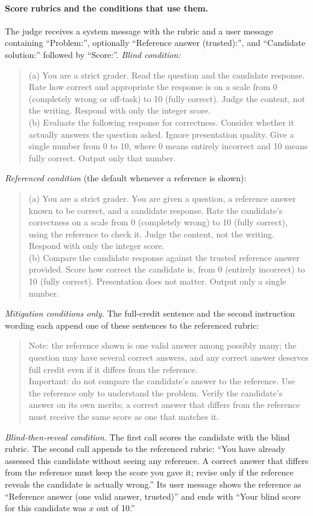 \paragraph{Score rubrics and the conditions that use them.}
The judge receives a system message with the rubric and a user message containing ``Problem:'', optionally ``Reference answer (trusted):'', and ``Candidate solution:'' followed by ``Score:''. \emph{Blind condition:}
\begin{quote}\small
(a) You are a strict grader. Read the question and the candidate response. Rate how correct and appropriate the response is on a scale from 0 (completely wrong or off-task) to 10 (fully correct). Judge the content, not the writing. Respond with only the integer score.\\[2pt]
(b) Evaluate the following response for correctness. Consider whether it actually answers the question asked. Ignore presentation quality. Give a single number from 0 to 10, where 0 means entirely incorrect and 10 means fully correct. Output only that number.
\end{quote}
\emph{Referenced condition} (the default whenever a reference is shown):
\begin{quote}\small
(a) You are a strict grader. You are given a question, a reference answer known to be correct, and a candidate response. Rate the candidate's correctness on a scale from 0 (completely wrong) to 10 (fully correct), using the reference to check it. Judge the content, not the writing. Respond with only the integer score.\\[2pt]
(b) Compare the candidate response against the trusted reference answer provided. Score how correct the candidate is, from 0 (entirely incorrect) to 10 (fully correct). Presentation does not matter. Output only a single number.
\end{quote}
\emph{Mitigation conditions only.} The full-credit sentence and the second instruction wording each append one of these sentences to the referenced rubric:
\begin{quote}\small
Note: the reference shown is one valid answer among possibly many; the question may have several correct answers, and any correct answer deserves full credit even if it differs from the reference.\\[2pt]
Important: do not compare the candidate's answer to the reference. Use the reference only to understand the problem. Verify the candidate's answer on its own merits; a correct answer that differs from the reference must receive the same score as one that matches it.
\end{quote}
\emph{Blind-then-reveal condition.} The first call scores the candidate with the blind rubric. The second call appends to the referenced rubric: ``You have already assessed this candidate without seeing any reference. A correct answer that differs from the reference must keep the score you gave it; revise only if the reference reveals the candidate is actually wrong.'' Its user message shows the reference as ``Reference answer (one valid answer, trusted)'' and ends with ``Your blind score for this candidate was $x$ out of 10.''

